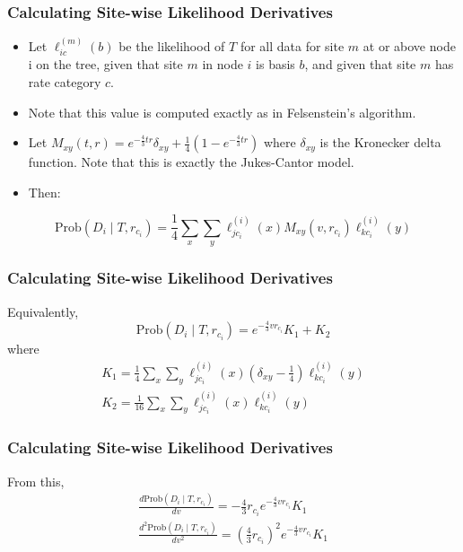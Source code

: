 \documentclass{beamer}
\newcommand{\prob}{\mathrm{Prob}}
\begin{document}
\begin{frame}
    \frametitle{Calculating Site-wise Likelihood Derivatives}
    \begin{itemize}
        \item Let $\ell_{ic}^{(m)}(b)$ be the likelihood of $T$ 
        for all data for site $m$ at or above node i on the tree, 
        given that site $m$ in node $i$ is basis $b$, 
        and given that site $m$ has rate category $c$.

        \item Note that this value is computed exactly as in Felsenstein's algorithm.

        \item Let $M_{xy}(t, r) = e^{-\frac{4}{3}tr}\delta_{xy} 
        + \frac{1}{4}\left(1 - e^{-\frac{4}{3}tr}\right)$
        where $\delta_{xy}$ is the Kronecker delta function.
        Note that this is exactly the Jukes-Cantor model.

        \item Then:
    \end{itemize}
    \[
        \prob(D_i \mid T, r_{c_i}) 
        = \frac{1}{4}\sum_x \sum_y \ell_{jc_i}^{(i)}(x) M_{xy}(v, r_{c_i}) \ell_{kc_i}^{(i)}(y)
    \]
\end{frame}

\begin{frame}
    \frametitle{Calculating Site-wise Likelihood Derivatives}
    Equivalently,
    \[
        \prob(D_i \mid T, r_{c_i})
        = e^{-\frac{4}{3}vr_{c_i}}K_1 + K_2
    \]
    where
    \begin{gather*}
        K_1 = \frac{1}{4}\sum_x \sum_y 
            \ell_{jc_i}^{(i)}(x) \left(\delta_{xy} - \frac{1}{4}\right) \ell_{kc_i}^{(i)}(y) \\
        K_2 = \frac{1}{16}\sum_x \sum_y 
            \ell_{jc_i}^{(i)}(x) \ell_{kc_i}^{(i)}(y)
    \end{gather*}
\end{frame}

\begin{frame}
    \frametitle{Calculating Site-wise Likelihood Derivatives}
    From this,
    \begin{gather*}
        \frac{d\prob(D_i \mid T, r_{c_i})}{dv} = -\frac{4}{3}r_{c_i}e^{-\frac{4}{3}vr_{c_i}}K_1 \\
        \frac{d^2\prob(D_i \mid T, r_{c_i})}{dv^2} = \left(\frac{4}{3}r_{c_i}\right)^2e^{-\frac{4}{3}vr_{c_i}}K_1
    \end{gather*}
\end{frame}
\end{document}
